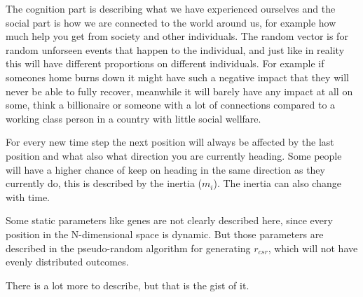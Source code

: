 \documentclass[28pt]{article}
\begin{document}
The cognition part is describing what we have experienced ourselves and the social part is how we are connected to the world around us, 
for example how much help you get from society and other individuals. 
The random vector is for random unforseen events that happen to the individual, and just like in reality this will have different
proportions on different individuals. For example if someones home burns down it might have such a negative impact that they will never be
able to fully recover, meanwhile it will barely have any impact at all on some, think a billionaire or someone with a lot of connections compared
to a working class person in a country with little social wellfare.

For every new time step the next position will always be affected by the last position and what also what direction you are currently heading. 
Some people will have a higher chance of keep on heading in the same direction as they currently do, this is described by the inertia ($m_i$).
The inertia can also change with time.

Some static parameters like genes are not clearly described here, since every position in the N-dimensional space is dynamic. 
But those parameters are described in the pseudo-random algorithm for generating $r_{csr}$, which will not have evenly distributed outcomes.

There is a lot more to describe, but that is the gist of it.
\end{document}
